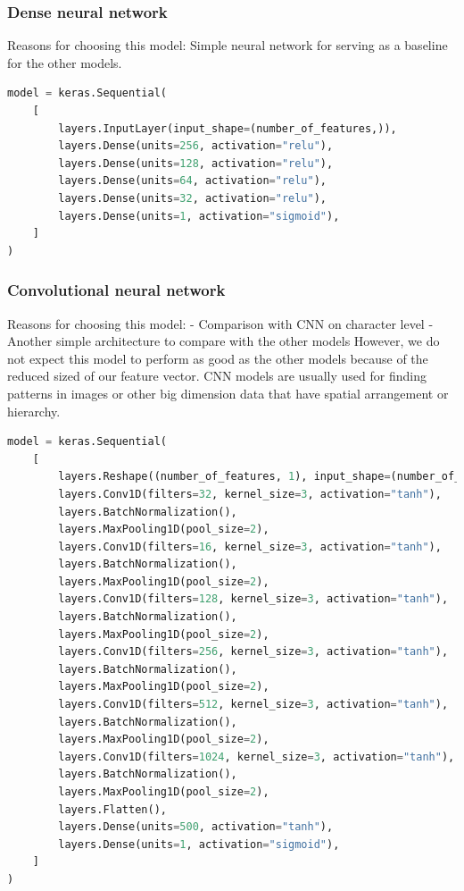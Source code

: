 \documentclass{article}
\begin{document}
    \subsubsection{Dense neural network}
    Reasons for choosing this model:
    Simple neural network for serving as a baseline for the other models.

    \begin{lstlisting}[language=Python, caption=DNN on feature vector architecture]
model = keras.Sequential(
    [
        layers.InputLayer(input_shape=(number_of_features,)),
        layers.Dense(units=256, activation="relu"),
        layers.Dense(units=128, activation="relu"),
        layers.Dense(units=64, activation="relu"),
        layers.Dense(units=32, activation="relu"),
        layers.Dense(units=1, activation="sigmoid"),
    ]
)
    \end{lstlisting}

    \subsubsection{Convolutional neural network}
    Reasons for choosing this model:
    - Comparison with CNN on character level
    - Another simple architecture to compare with the other models
    However, we do not expect this model to perform as good as the other models because of the reduced sized of our feature vector.
    CNN models are usually used for finding patterns in images or other big dimension data that have spatial arrangement or hierarchy.

    \begin{lstlisting}[language=Python, caption=CNN on feature vector architecture]
model = keras.Sequential(
    [
        layers.Reshape((number_of_features, 1), input_shape=(number_of_features,)),
        layers.Conv1D(filters=32, kernel_size=3, activation="tanh"),
        layers.BatchNormalization(),
        layers.MaxPooling1D(pool_size=2),
        layers.Conv1D(filters=16, kernel_size=3, activation="tanh"),
        layers.BatchNormalization(),
        layers.MaxPooling1D(pool_size=2),
        layers.Conv1D(filters=128, kernel_size=3, activation="tanh"),
        layers.BatchNormalization(),
        layers.MaxPooling1D(pool_size=2),
        layers.Conv1D(filters=256, kernel_size=3, activation="tanh"),
        layers.BatchNormalization(),
        layers.MaxPooling1D(pool_size=2),
        layers.Conv1D(filters=512, kernel_size=3, activation="tanh"),
        layers.BatchNormalization(),
        layers.MaxPooling1D(pool_size=2),
        layers.Conv1D(filters=1024, kernel_size=3, activation="tanh"),
        layers.BatchNormalization(),
        layers.MaxPooling1D(pool_size=2),
        layers.Flatten(),
        layers.Dense(units=500, activation="tanh"),
        layers.Dense(units=1, activation="sigmoid"),
    ]
)
    \end{lstlisting}
\end{document}
